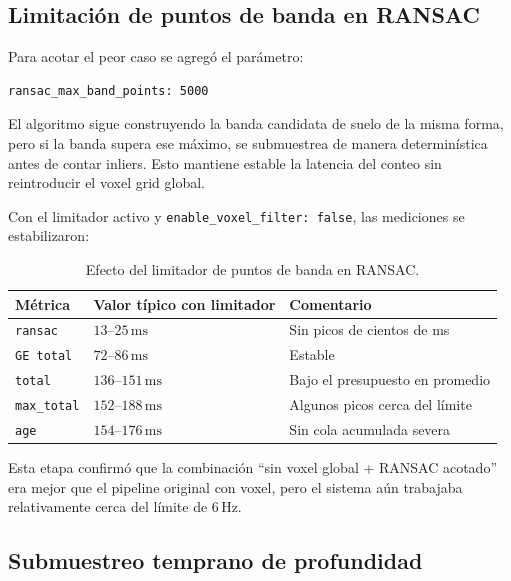 \subsection{Limitación de puntos de banda en RANSAC}
\label{subsec:perf-ransac-limit}

Para acotar el peor caso se agregó el parámetro:

\begin{verbatim}
ransac_max_band_points: 5000
\end{verbatim}

El algoritmo sigue construyendo la banda candidata de suelo de la misma forma,
pero si la banda supera ese máximo, se submuestrea de manera determinística
antes de contar inliers. Esto mantiene estable la latencia del conteo sin
reintroducir el voxel grid global.

Con el limitador activo y \texttt{enable\_voxel\_filter: false}, las mediciones
se estabilizaron:

\begin{table}[H]
\centering
\begin{tabular}{lll}
\toprule
\textbf{Métrica} & \textbf{Valor típico con limitador} & \textbf{Comentario} \\
\midrule
\texttt{ransac} & $13$--$25\,\mathrm{ms}$ & Sin picos de cientos de ms \\
\texttt{GE total} & $72$--$86\,\mathrm{ms}$ & Estable \\
\texttt{total} & $136$--$151\,\mathrm{ms}$ & Bajo el presupuesto en promedio \\
\texttt{max\_total} & $152$--$188\,\mathrm{ms}$ & Algunos picos cerca del límite \\
\texttt{age} & $154$--$176\,\mathrm{ms}$ & Sin cola acumulada severa \\
\bottomrule
\end{tabular}
\caption{Efecto del limitador de puntos de banda en RANSAC.}
\label{tab:perf-ransac-limit}
\end{table}

Esta etapa confirmó que la combinación ``sin voxel global + RANSAC acotado''
era mejor que el pipeline original con voxel, pero el sistema aún trabajaba
relativamente cerca del límite de $6\,\mathrm{Hz}$.

\subsection{Submuestreo temprano de profundidad}
\label{subsec:perf-depth-stride}

